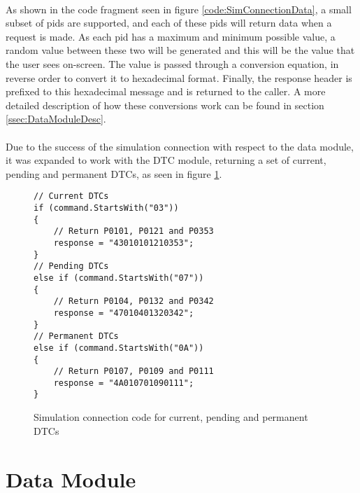 		\paragraph{}{
		As shown in the code fragment seen  in figure \ref{code:SimConnectionData}, a small subset of pids are supported, and each of these pids will return data when a request is made. As each pid has a maximum and minimum possible value, a random value between these two will be generated and this will be the value that the user sees on-screen. The value  is passed through a conversion equation, in reverse order to convert it to hexadecimal format. Finally, the response header is prefixed to this hexadecimal message and is returned to the caller. A more detailed description of how these conversions work can be found in section \ref{ssec:DataModuleDesc}.
		}
		\paragraph{}{
		Due to the success of the simulation connection with respect to the data module, it was expanded to work with the DTC module, returning a set of current, pending and permanent DTCs, as seen in figure \ref{code:SimConnectionDTC}.
		}
		
		\begin{figure}[h]
			\begin{lstlisting}
// Current DTCs
if (command.StartsWith("03"))
{
	// Return P0101, P0121 and P0353	
	response = "43010101210353";
}
// Pending DTCs
else if (command.StartsWith("07"))
{
	// Return P0104, P0132 and P0342	
	response = "47010401320342";
}
// Permanent DTCs
else if (command.StartsWith("0A"))
{
	// Return P0107, P0109 and P0111	
	response = "4A010701090111";
}			
			\end{lstlisting}
			\caption{Simulation connection code for current, pending and permanent DTCs}
			\label{code:SimConnectionDTC}
		\end{figure}

\section{Data Module}
